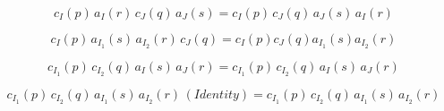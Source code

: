 \documentclass[12pt]{article}
\numberwithin{equation}{section}
\begin{document}
\begin{equation}
c_{I}(p) \, a_{I}(r) \, c_{J}(q) \, a_{J}(s) = c_{I}(p) \, c_{J}(q) \, a_{J}(s) \, a_{I}(r)
\end{equation}

\begin{equation}
c_{I}(p) \, a_{I_1}(s) \, a_{I_2}(r) \, c_{J}(q) = c_I(p) c_J(q) a_{I_1}(s) a_{I_2}(r)
\end{equation}

\begin{equation}
c_{I_1}(p) \, c_{I_2}(q) \, a_I(s) \, a_J(r) = c_{I_1}(p) \, c_{I_2}(q) \, a_I(s) \, a_J(r)
\end{equation}

\begin{equation}
c_{I_1}(p) \, c_{I_2}(q) \, a_{I_1}(s) \, a_{I_2}(r) \, (Identity) = c_{I_1}(p) \, c_{I_2}(q) \, a_{I_1}(s) \, a_{I_2}(r)
\end{equation}
\end{document}
